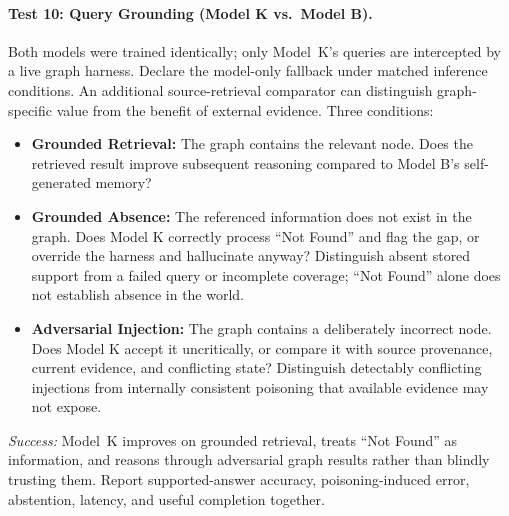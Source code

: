 \documentclass[11pt]{article}
\begin{document}
\paragraph{Test 10: Query Grounding (Model K vs.\ Model B).}
Both models were trained identically; only Model~K's queries are intercepted
by a live graph harness. Declare the model-only fallback under matched inference conditions. An
additional source-retrieval comparator can distinguish graph-specific value
from the benefit of external evidence. Three conditions:
\begin{itemize}
    \item \textbf{Grounded Retrieval:} The graph contains the relevant node.
    Does the retrieved result improve subsequent reasoning compared to
    Model B's self-generated memory?
    \item \textbf{Grounded Absence:} The referenced information does not
    exist in the graph. Does Model K correctly process ``Not Found'' and flag
    the gap, or override the harness and hallucinate anyway? Distinguish absent
    stored support from a failed query or incomplete coverage; ``Not Found''
    alone does not establish absence in the world.
    \item \textbf{Adversarial Injection:} The graph contains a deliberately
    incorrect node. Does Model K accept it uncritically, or compare it with
    source provenance, current evidence, and conflicting state? Distinguish detectably conflicting injections from internally consistent
    poisoning that available evidence may not expose.
\end{itemize}
\emph{Success:} Model~K improves on grounded retrieval, treats ``Not Found'' as
information, and reasons through adversarial graph results rather than blindly
trusting them. Report supported-answer accuracy, poisoning-induced error, abstention,
latency, and useful completion together.
\end{document}
